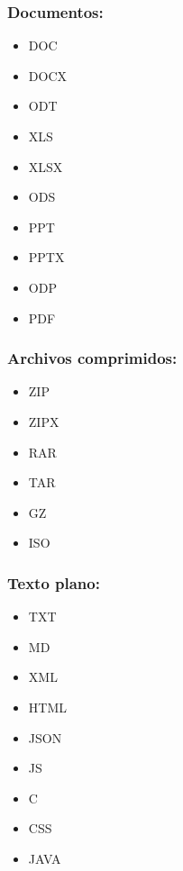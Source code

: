\begin{minipage}[t]{0.3\textwidth}
    \subsubsection*{Documentos:}
    \label{chap:informatica:subsubsec:docs}

    \begin{itemize}
        \item DOC
        \item DOCX
        \item ODT
        \item XLS
        \item XLSX
        \item ODS
        \item PPT
        \item PPTX
        \item ODP
        \item PDF
    \end{itemize}
\end{minipage}
\begin{minipage}[t]{0.3\textwidth}
    \subsubsection*{Archivos comprimidos:}
    \label{chap:informatica:subsubsec:compresion}

    \begin{itemize}
        \item ZIP
        \item ZIPX
        \item RAR
        \item TAR
        \item GZ
        \item ISO
    \end{itemize}
\end{minipage}
\begin{minipage}[t]{0.3\textwidth}
    \subsubsection*{Texto plano:}
    \label{chap:informatica:subsubsec:texto}

    \begin{itemize}
        \item TXT
        \item MD
        \item XML
        \item HTML
        \item JSON
        \item JS
        \item C
        \item CSS
        \item JAVA
    \end{itemize}
\end{minipage}

